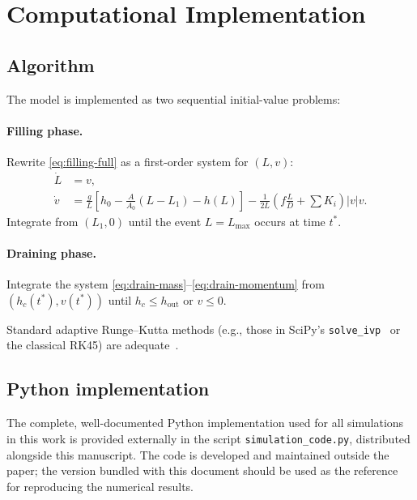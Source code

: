 \documentclass[11pt]{article}
\theoremstyle{definition}
\begin{document}
\section{Computational Implementation}
\label{sec:computation}

\subsection{Algorithm}

The model is implemented as two sequential initial-value problems:

\paragraph{Filling phase.}
Rewrite \eqref{eq:filling-full} as a first-order system for $(L, v)$:
\begin{align*}
  \dot{L} &= v, \\
  \dot{v} &= \frac{g}{L}\left[h_0 - \frac{A}{A_0}(L - L_1) - h(L)\right]
             - \frac{1}{2L}\left(f \frac{L}{D} + \sum K_i\right) |v| v.
\end{align*}
Integrate from $(L_1, 0)$ until the event $L = L_{\max}$ occurs at time $t^*$.

\paragraph{Draining phase.}
Integrate the system \eqref{eq:drain-mass}--\eqref{eq:drain-momentum} from 
$(h_c(t^*), v(t^*))$ until $h_c \le h_{\text{out}}$ or $v \le 0$.

Standard adaptive Runge--Kutta methods (e.g., those in SciPy's \texttt{solve\_ivp}~\cite{scipy} or 
the classical RK45) are adequate~\cite{hairer}.

\subsection{Python implementation}

The complete, well-documented Python implementation used for all simulations in this work
is provided externally in the script \texttt{simulation\_code.py}, distributed alongside
this manuscript. The code is developed and maintained outside the paper; the version
bundled with this document should be used as the reference for reproducing the numerical
results.
\end{document}
